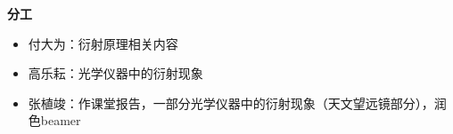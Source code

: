 \begin{frame}{\textbf{分工}}
    \begin{itemize}
        \item 付大为：衍射原理相关内容
        \item 高乐耘：光学仪器中的衍射现象
        \item 张植竣：作课堂报告，一部分光学仪器中的衍射现象（天文望远镜部分），润色beamer
    \end{itemize}
\end{frame}